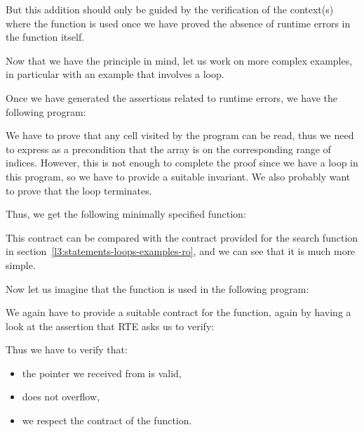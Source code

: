 

But this addition should only be guided by the verification of the context(s)
where the function is used once we have proved the absence of runtime errors in
the function itself.





Now that we have the principle in mind, let us work on more complex examples, in
particular with an example that involves a loop.




Once we have generated the assertions related to runtime errors, we have the
following program:




We have to prove that any cell visited by the program can be read, thus we need
to express as a precondition that the array is
 on the corresponding range of indices.
However, this is not enough to complete the proof since we have a loop in this
program, so we have to provide a suitable invariant. We also probably want to
prove that the loop terminates.


Thus, we get the following minimally specified function:




This contract can be compared with the contract provided for the search
function in section~\ref{l3:statements-loops-examples-ro}, and we can see that it is
much more simple.


Now let us imagine that the function is used in the following program:




We again have to provide a suitable contract for the function, again by having
a look at the assertion that RTE asks us to verify:




Thus we have to verify that:


\begin{itemize}
\item the pointer we received from  is valid,
\item {} does not overflow,
\item we respect the contract of the  function.
\end{itemize}


